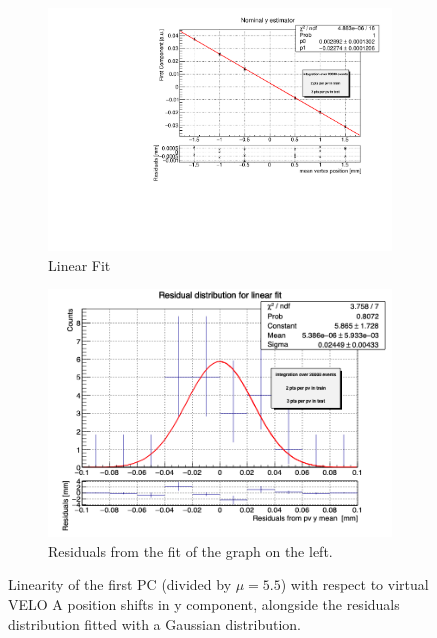 \begin{figure}
    \centering
    \begin{subfigure}{0.48\textwidth}
    \includegraphics[width=\linewidth]{figures/y_fit_veloA_MC_normalised.pdf}
    \caption{Linear Fit}\label{fig:y_veloA_fit_MC}
    \end{subfigure}
    \begin{subfigure}{0.48\textwidth}
    \includegraphics[width=\linewidth]{figures/y_res_veloA_MC.png}
    \caption{Residuals from the fit of the graph on the left. }\label{fig:y_veloA_res_MC}
    \end{subfigure}
    \caption{Linearity of the first PC (divided by $\mu=5.5$) with respect to virtual VELO A position shifts in y component, alongside the residuals distribution fitted with a Gaussian distribution.}
    \label{fig:y_veloA_MC}
\end{figure}

